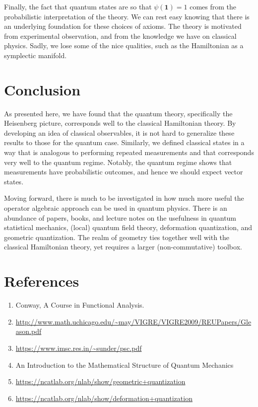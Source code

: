 \documentclass[leqno]{article}
\theoremstyle{definition}
\theoremstyle{remark}
\theoremstyle{theorem}
\begin{document}
Finally,  the fact that quantum states are so that $\psi(\mathbf{1})=1$ comes from the probabilistic interpretation of the theory. We can rest easy knowing that there is an underlying foundation for these choices of axioms.  The theory is motivated from experimental observation, and from the knowledge we have on classical physics.  Sadly, we lose some of the nice qualities, such as the Hamiltonian as a symplectic manifold.

\section{Conclusion}

As presented here, we have found that the quantum theory, specifically the Heisenberg picture, corresponds well to the classical Hamiltonian theory.  By developing an idea of classical observables, it is not hard to generalize these results to those for the quantum case.  Similarly, we defined classical states in a way that is analogous to performing repeated measurements and that corresponds very well to the quantum regime.  Notably, the quantum regime shows that measurements have probabilistic outcomes, and hence we should expect vector states. 

Moving forward, there is much to be investigated in how much more useful the operator algebraic approach can be used in quantum physics.  There is an abundance of papers, books, and lecture notes on the usefulness in quantum statistical mechanics, (local) quantum field theory, deformation quantization, and geometric quantization.  The realm of geometry ties together well with the classical Hamiltonian theory, yet requires a larger (non-commutative) toolbox.





\section{References}
\begin{enumerate}[1.]
\item Conway, A Course in Functional Analysis.
\item \url{http://www.math.uchicago.edu/~may/VIGRE/VIGRE2009/REUPapers/Gleason.pdf}\\
\item \url{https://www.imsc.res.in/~sunder/psc.pdf}
\item An Introduction to the Mathematical Structure of Quantum Mechanics
\item \url{https://ncatlab.org/nlab/show/geometric+quantization}
\item \url{https://ncatlab.org/nlab/show/deformation+quantization}
\end{enumerate}
\end{document}
